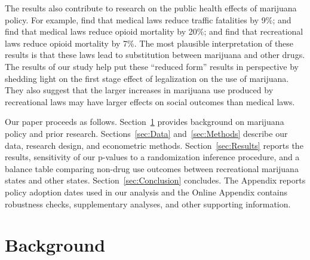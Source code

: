 \documentclass[12pt]{article}%
\begin{document}
The results also contribute to research on the public health effects of marijuana policy. For example, \citet{Anderson2013} find that medical laws reduce traffic fatalities by 9\%; \citet{Bachhuber2014} and \citet{Powell2018} find that medical laws reduce opioid mortality by 20\%; and \citet{Chan2019} find that recreational laws reduce opioid mortality by 7\%. The most plausible interpretation of these results is that these laws lead to substitution between marijuana and other drugs. The results of our study help put these ``reduced form'' results in perspective by shedding light on the first stage effect of legalization on the use of marijuana. They also suggest that the larger increases in marijuana use produced by recreational laws may have larger effects on social outcomes than medical laws.

Our paper proceeds as follows. Section~\ref{sec:background} provides  background on marijuana policy and prior research.  Sections~\ref{sec:Data} and~\ref{sec:Methods} describe our data, research design, and econometric methods. Section~\ref{sec:Results} reports the results, sensitivity of our p-values to a randomization inference procedure, and a balance table comparing non-drug use outcomes between recreational marijuana states and other states. Section~\ref{sec:Conclusion} concludes. The Appendix reports policy adoption dates used in our analysis and the Online Appendix contains robustness checks, supplementary analyses, and other supporting information.


\section{Background} 
\label{sec:background}
\end{document}
